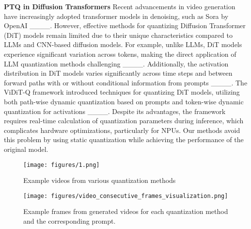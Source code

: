 \textbf{PTQ in Diffusion Transformers}
Recent advancements in video generation have increasingly adopted transformer models in denoising, such as Sora by OpenAI ____. However, effective methods for quantizing Diffusion Transformer (DiT) models remain limited due to their unique characteristics compared to LLMs and CNN-based diffusion models. For example, unlike LLMs, DiT models experience significant variation across tokens, making the direct application of LLM quantization methods challenging ____. Additionally, the activation distribution in DiT models varies significantly across time steps and between forward paths with or without conditional information from prompts ____. The ViDiT-Q framework introduced techniques for quantizing DiT models, utilizing both path-wise dynamic quantization based on prompts and token-wise dynamic quantization for activations ____. Despite its advantages, the framework requires real-time calculation of quantization parameters during inference, which complicates hardware optimizations, particularly for NPUs. Our methods avoid this problem by using static quantization while achieving the performance of the original model.


\begin{figure}[t]
	\centering
	\texttt{[image: figures/1.png]}
	\caption{Example videos from various quantization methods
	}
	\label{fig1}
\end{figure}

\begin{figure*}[t]
	\centering
	\texttt{[image: figures/video\_consecutive\_frames\_visualization.png]}
	\caption{Example frames from generated videos for each quantization method and the corresponding prompt.
	}
	\label{fig_frames}
\end{figure*}